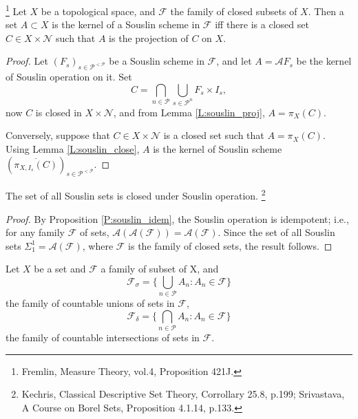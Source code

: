 \begin{proposition} \label{P:souslin_equiv}
\footnote{Fremlin, Measure Theory, vol.4, Proposition 421J.}
Let $X$ be a topological space, and $\mathcal{F}$ the family of closed subsets
of $X$. Then a set $A\subset X$ is the kernel of a Souslin scheme in  
$\mathcal{F}$ iff there is a closed set $C\in X\times\mathcal{N}$ such that $A$
is the projection of $C$ on $X$.
\end{proposition}
\begin{proof}
Let $(F_s)_{s\in\mathcal{P}^{<\mathcal{P}}}$ be a Souslin scheme in
$\mathcal{F}$, and let $A=\mathcal{A} F_s$ be the kernel of Souslin operation 
on it. Set
\[
  C = \bigcap_{n\in\mathcal{P}} \bigcup_{s\in\mathcal{P}^n} F_s \times I_s,
\]
now $C$ is closed in $X\times\mathcal{N}$, and from Lemma \ref{L:souslin_proj},
$A=\pi_X(C)$.

Conversely, suppose that $C\in X\times\mathcal{N}$ is a closed set such that
$A=\pi_X(C)$. Using Lemma \ref{L:souslin_close}, $A$ is the kernel of Souslin
scheme $(\overline{\pi_{X,I_s}(C)})_{s\in\mathcal{P}^{<\mathcal{P}}}$.
\end{proof}

\begin{proposition} \label{P:souslin_oper}
The set of all Souslin sets is closed under Souslin operation.
  \footnote{
    Kechris, Classical Descriptive Set Theory, Corrollary 25.8, p.199;
    Srivastava, A Course on Borel Sets, Proposition 4.1.14, p.133.}
\end{proposition}
\begin{proof}
By Proposition \ref{P:souslin_idem}, the Souslin operation is idempotent; i.e.,
for any family $\mathcal{F}$ of sets, 
$\mathcal{A}(\mathcal{A}(\mathcal{F})) =\mathcal{A}(\mathcal{F})$. Since the set
of all Souslin sets $\Sigma_1^1=\mathcal{A}(\mathcal{F})$, where $\mathcal{F}$
is the family of closed sets, the result follows.
\end{proof}

Let $X$ be a set and $\mathcal{F}$ a family of subset of X, and
\[
	\mathcal{F}_{\sigma} 
	= \{  
	  \bigcup_{n\in\mathcal{P}} A_n: A_n\in\mathcal{F}
	\}
\]
the family of countable unions of sets in $\mathcal{F}$,
\[
	\mathcal{F}_{\delta} 
	= \{  
	  \bigcap_{n\in\mathcal{P}} A_n: A_n\in\mathcal{F}
	\}
\]
the family of countable intersections of sets in $\mathcal{F}$.

